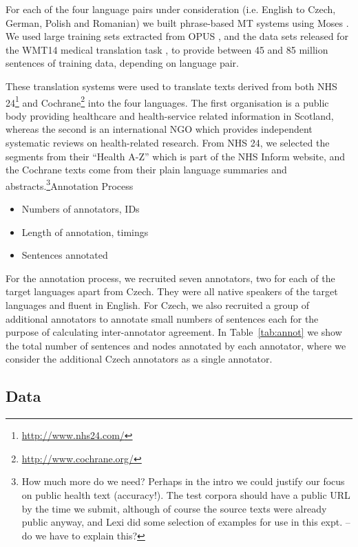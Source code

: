 \documentclass[11pt]{article}
\newcommand{\tabref}[1]{Table~\ref{#1}}
\newcommand{\bh}[2]{\footnote{\color{blue} #1}}
\begin{document}
For each of the four language pairs under consideration (i.e. English to 
Czech, German, Polish and Romanian) we built phrase-based MT systems
using Moses \cite{Koehn:2007}. We used large training sets extracted from OPUS \cite{tiedemann:2009}, and
the data sets released for the WMT14 medical translation task \cite{bojar-EtAl:2014:W14-33}, to provide between
45 and 85 million sentences of training data, depending on language pair.

These translation systems were used to translate texts derived from both NHS 24\footnote{\url{http://www.nhs24.com/}} and 
Cochrane\footnote{\url{http://www.cochrane.org/}} into the four languages. The first organisation is a public body
providing healthcare and health-service related information in Scotland, whereas the second is an international NGO which 
provides independent systematic reviews on health-related research. From NHS 24, we selected the segments from their
``Health A-Z'' which is part of the NHS Inform website, and the Cochrane texts come from their plain language summaries
and abstracts.\bh{How much more do we need? Perhaps in the intro we could justify our focus on public health text
(accuracy!). The test corpora should have a public URL by the time we submit, although of course the source texts were 
already public anyway, and Lexi did some selection of examples for use in this expt. -- do we have to explain this?}

\subsection{Annotation Process}
\begin{itemize}
  \item Numbers of annotators, IDs
  \item Length of annotation, timings
  \item Sentences annotated
\end{itemize}

For the annotation process, we recruited seven annotators, two for each of the target languages apart from Czech. They were
all native speakers of the target languages and fluent in English. For Czech, we also recruited a  group of additional annotators
to annotate small numbers of sentences each for the purpose of calculating inter-annotator agreement. In \tabref{tab:annot}
we show the total number of sentences and nodes annotated by each annotator, where we consider the additional Czech
annotators as a single annotator.

\subsection{Data}\label{sec:data}
\end{document}
